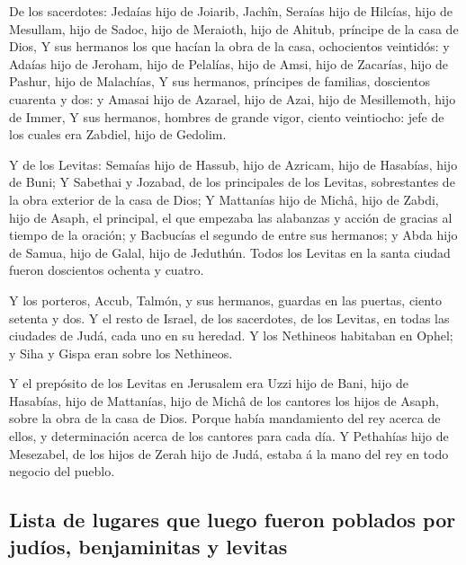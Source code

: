  De los sacerdotes: Jedaías hijo de Joiarib, Jachîn,
 Seraías hijo de Hilcías, hijo de Mesullam, hijo de
Sadoc, hijo de Meraioth, hijo de Ahitub, príncipe de la casa de Dios,
 Y sus hermanos los que hacían la obra de la casa,
ochocientos veintidós: y Adaías hijo de Jeroham, hijo de Pelalías, hijo
de Amsi, hijo de Zacarías, hijo de Pashur, hijo de Malachías,
 Y sus hermanos, príncipes de familias, doscientos
cuarenta y dos: y Amasai hijo de Azarael, hijo de Azai, hijo de
Mesillemoth, hijo de Immer,  Y sus hermanos, hombres de
grande vigor, ciento veintiocho: jefe de los cuales era Zabdiel, hijo de
Gedolim.

 Y de los Levitas: Semaías hijo de Hassub, hijo de
Azricam, hijo de Hasabías, hijo de Buni;  Y Sabethai y
Jozabad, de los principales de los Levitas, sobrestantes de la obra
exterior de la casa de Dios;  Y Mattanías hijo de Michâ,
hijo de Zabdi, hijo de Asaph, el principal, el que empezaba las
alabanzas y acción de gracias al tiempo de la oración; y Bacbucías el
segundo de entre sus hermanos; y Abda hijo de Samua, hijo de Galal, hijo
de Jeduthún.  Todos los Levitas en la santa ciudad fueron
doscientos ochenta y cuatro.

 Y los porteros, Accub, Talmón, y sus hermanos, guardas
en las puertas, ciento setenta y dos.  Y el resto de
Israel, de los sacerdotes, de los Levitas, en todas las ciudades de
Judá, cada uno en su heredad.  Y los Nethineos habitaban
en Ophel; y Siha y Gispa eran sobre los Nethineos.

 Y el prepósito de los Levitas en Jerusalem era Uzzi hijo
de Bani, hijo de Hasabías, hijo de Mattanías, hijo de Michâ de los
cantores los hijos de Asaph, sobre la obra de la casa de Dios.
 Porque había mandamiento del rey acerca de ellos, y
determinación acerca de los cantores para cada día.  Y
Pethahías hijo de Mesezabel, de los hijos de Zerah hijo de Judá, estaba
á la mano del rey en todo negocio del pueblo.

\hypertarget{lista-de-lugares-que-luego-fueron-poblados-por-juduxedos-benjaminitas-y-levitas}{%
\subsection{Lista de lugares que luego fueron poblados por judíos,
benjaminitas y
levitas}\label{lista-de-lugares-que-luego-fueron-poblados-por-juduxedos-benjaminitas-y-levitas}}

